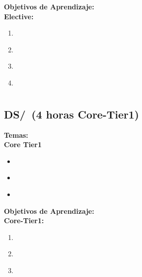 \noindent \textbf{Objetivos de Aprendizaje:}\\
\noindent \textbf{Elective:}
\begin{enumerate}
	\setcounter{enumi}{0}
	\item \CNNumericalAnalysisLODefineError\xspace[\CNNumericalAnalysisLODefineErrorLevel]\label{sec:BOK:CNNumericalAnalysisLODefineError}
	\item \CNNumericalAnalysisLOImplementTaylor\xspace[\CNNumericalAnalysisLOImplementTaylorLevel]\label{sec:BOK:CNNumericalAnalysisLOImplementTaylor}
	\item \CNNumericalAnalysisLOImplementAlgorithms\xspace[\CNNumericalAnalysisLOImplementAlgorithmsLevel]\label{sec:BOK:CNNumericalAnalysisLOImplementAlgorithms}
	\item \CNNumericalAnalysisLOImplementAlgorithmsDifferential\xspace[\CNNumericalAnalysisLOImplementAlgorithmsDifferentialLevel]\label{sec:BOK:CNNumericalAnalysisLOImplementAlgorithmsDifferential}
\end{enumerate}




\section{\DS}\label{sec:BOK:DS}
\DSBOKDescription


\subsection{DS/\DSSetsRelationsandFunctions~(4 horas Core-Tier1)}\label{sec:BOK:DSSetsRelationsandFunctions}
\noindent \textbf{Temas:}\\
\noindent \textbf{Core Tier1}
\begin{itemize}
	\item \DSSetsRelationsandFunctionsTopicSets\label{sec:BOK:DSSetsRelationsandFunctionsTopicSets}
	\item \DSSetsRelationsandFunctionsTopicRelations\label{sec:BOK:DSSetsRelationsandFunctionsTopicRelations}
	\item \DSSetsRelationsandFunctionsTopicFunctions\label{sec:BOK:DSSetsRelationsandFunctionsTopicFunctions}
\end{itemize}


\noindent \textbf{Objetivos de Aprendizaje:}\\
\noindent \textbf{Core-Tier1:}
\begin{enumerate}
	\setcounter{enumi}{0}
	\item \DSSetsRelationsandFunctionsLOExplainWith\xspace[\DSSetsRelationsandFunctionsLOExplainWithLevel]\label{sec:BOK:DSSetsRelationsandFunctionsLOExplainWith}
	\item \DSSetsRelationsandFunctionsLOPerformThe\xspace[\DSSetsRelationsandFunctionsLOPerformTheLevel]\label{sec:BOK:DSSetsRelationsandFunctionsLOPerformThe}
	\item \DSSetsRelationsandFunctionsLORelate\xspace[\DSSetsRelationsandFunctionsLORelateLevel]\label{sec:BOK:DSSetsRelationsandFunctionsLORelate}
\end{enumerate}


